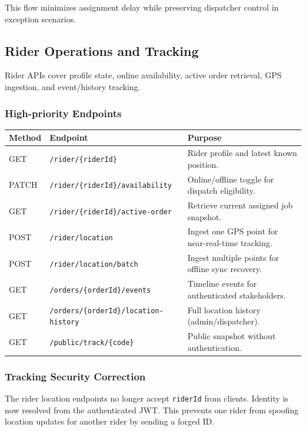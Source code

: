 This flow minimizes assignment delay while preserving dispatcher control in
exception scenarios.

\subsection{Rider Operations and Tracking}

Rider APIs cover profile state, online availability, active order retrieval,
GPS ingestion, and event/history tracking.

\subsubsection{High-priority Endpoints}

\begin{tabularx}{\textwidth}{@{}p{2.2cm}p{4.8cm}X@{}}
\toprule
\textbf{Method} & \textbf{Endpoint} & \textbf{Purpose} \\
\midrule
GET & \texttt{/rider/\{riderId\}} & Rider profile and latest known position. \\
PATCH & \texttt{/rider/\{riderId\}/availability} & Online/offline toggle for dispatch eligibility. \\
GET & \texttt{/rider/\{riderId\}/active-order} & Retrieve current assigned job snapshot. \\
POST & \texttt{/rider/location} & Ingest one GPS point for near-real-time tracking. \\
POST & \texttt{/rider/location/batch} & Ingest multiple points for offline sync recovery. \\
GET & \texttt{/orders/\{orderId\}/events} & Timeline events for authenticated stakeholders. \\
GET & \texttt{/orders/\{orderId\}/location-history} & Full location history (admin/dispatcher). \\
GET & \texttt{/public/track/\{code\}} & Public snapshot without authentication. \\
\bottomrule
\end{tabularx}

\subsubsection{Tracking Security Correction}

The rider location endpoints no longer accept \texttt{riderId} from clients.
Identity is now resolved from the authenticated JWT. This prevents one rider
from spoofing location updates for another rider by sending a forged ID.

